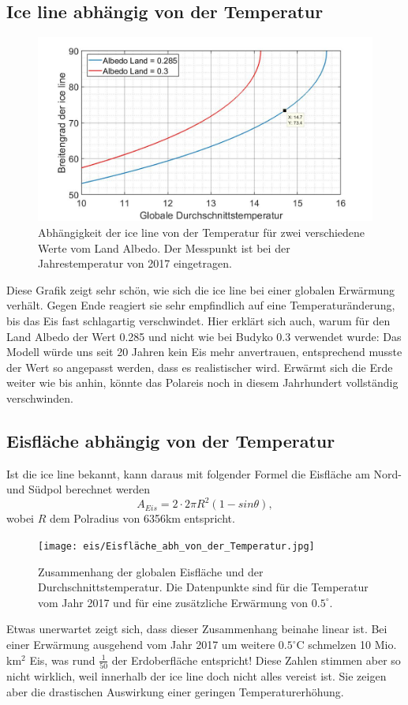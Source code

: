 \begin{refsection}
\subsection{Ice line abhängig von der Temperatur}
\begin{figure}[H]
	\centering
	\includegraphics[width=14cm]{eis/iceline_abh_von_der_Temperatur_mit_Verleich_albedo_0,3.jpg}
	\caption{Abhängigkeit der ice line von der Temperatur für zwei verschiedene Werte vom Land Albedo. Der Messpunkt ist bei der Jahrestemperatur von 2017 eingetragen.}
\end{figure}
Diese Grafik zeigt sehr schön, wie sich die ice line bei einer globalen Erwärmung verhält. Gegen Ende reagiert sie sehr empfindlich auf eine Temperaturänderung, bis das Eis fast schlagartig verschwindet. Hier erklärt sich auch, warum für den Land Albedo der Wert 0.285 und nicht wie bei Budyko 0.3 verwendet wurde: Das Modell würde uns seit 20 Jahren kein Eis mehr anvertrauen, entsprechend musste der Wert so angepasst werden, dass es realistischer wird. Erwärmt sich die Erde weiter wie bis anhin, könnte das Polareis noch in diesem Jahrhundert vollständig verschwinden.
\subsection{Eisfläche abhängig von der Temperatur}
Ist die ice line bekannt, kann daraus mit folgender Formel die Eisfläche am Nord- und Südpol berechnet werden
\begin{equation} \label{Eisfläche}
	A_{Eis}=2\cdot 2\pi R^2(1-sin\theta),
\end{equation}
wobei $R$ dem Polradius von 6356km entspricht.
\begin{figure}[H]
	\centering
	\texttt{[image: eis/Eisfläche\_abh\_von\_der\_Temperatur.jpg]}
	\caption{Zusammenhang der globalen Eisfläche und der Durchschnittstemperatur. Die Datenpunkte sind für die Temperatur vom Jahr 2017 und für eine zusätzliche Erwärmung von $0.5^{\circ}$.}
\end{figure}
Etwas unerwartet zeigt sich, dass dieser Zusammenhang beinahe linear ist. Bei einer Erwärmung ausgehend vom Jahr 2017 um weitere $0.5^{\circ}$C schmelzen 10 Mio. km$^2$ Eis, was rund $\tfrac{1}{50}$ der Erdoberfläche entspricht! Diese Zahlen stimmen aber so nicht wirklich, weil innerhalb der ice line doch nicht alles vereist ist. Sie zeigen aber die drastischen Auswirkung einer geringen Temperaturerhöhung.

\end{refsection}
